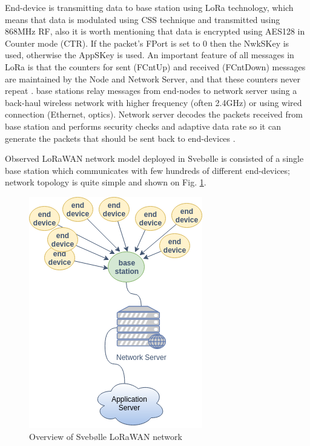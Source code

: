 \documentclass[11pt, a4paper]{article} %
\begin{document}
End-device is transmitting data to base station using LoRa technology, which means that data is modulated using CSS technique and transmitted using 868MHz RF, also it is worth mentioning that data is encrypted using AES128 in Counter mode (CTR). If the packet’s FPort is set to 0 then the NwkSKey is used, otherwise the AppSKey is used. An important feature of all messages in LoRa is that the counters for sent (FCntUp) and received (FCntDown) messages are maintained by the Node and Network Server, and that these counters never repeat \cite{Miller_LoRaSecurity}.
base stations relay messages from end-nodes to network server using a back-haul wireless network with higher frequency (often 2.4GHz) or using wired connection (Ethernet, optics). 
Network server decodes the packets received from base station and performs security checks and adaptive data rate so it can generate the packets that should be sent back to end-devices \cite{Silva_LoRaWAN}.

Observed LoRaWAN network model deployed in Svebølle is consisted of a single base station which communicates with few hundreds of different end-devices; network topology is quite simple and shown on Fig. \ref{svebolle}.
\begin{figure}
	\centering
	\includegraphics[scale=.7]{images/Svebolle-Topology.png} %
	\caption{Overview of Svebølle LoRaWAN network} %
	\label{svebolle} 
\end{figure}
\end{document}
